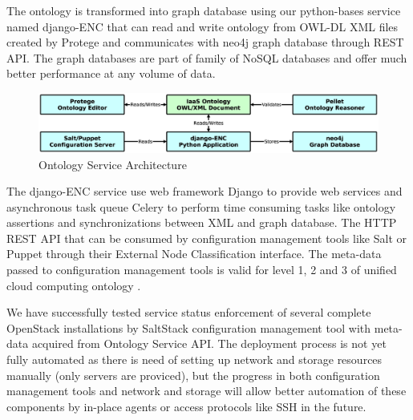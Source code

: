The ontology is transformed into graph database using our python-bases service named django-ENC that can read and write ontology from OWL-DL XML files created by Protege and communicates with neo4j graph database through REST API. The graph databases are part of family of NoSQL databases and offer much better performance at any volume of data.

\begin{figure}[!h]
\centering
\includegraphics[scale=.17]{img/django_enc_arch.eps}
\caption{Ontology Service Architecture}
\label{fig:cm}
\end{figure}

The django-ENC service use web framework Django to provide web services and asynchronous task queue Celery to perform time consuming tasks like ontology assertions and synchronizations between XML and graph database. The HTTP REST API that can be consumed by configuration management tools like Salt or Puppet through their External Node Classification interface. The meta-data passed to configuration management tools is valid for level 1, 2 and 3 of unified cloud computing ontology \cite{OntologyComputing}. 

We have successfully tested service status enforcement of several complete OpenStack installations by SaltStack configuration management tool with meta-data acquired from Ontology Service API. The deployment process is not yet fully automated as there is need of setting up network and storage resources manually (only servers are proviced), but the progress in both configuration management tools and network and storage will allow better automation of these components by in-place agents or access protocols like SSH in the future.




